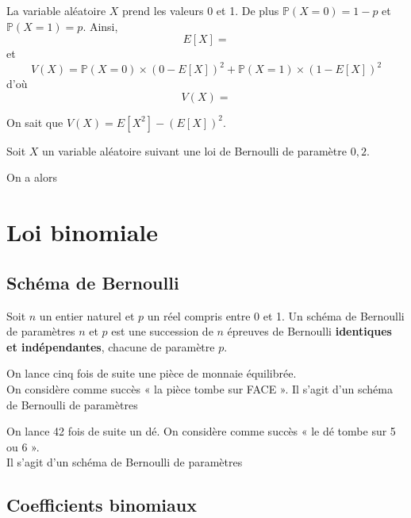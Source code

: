 \documentclass[11pt,fleqn, openany]{book} %
\begin{document}
\begin{demonstration} La variable aléatoire $X$ prend les valeurs 0 et 1. De plus $\mathbb{P}(X=0)=1-p$ et \\ $\mathbb{P}(X=1)=p$. Ainsi,
\[E[X] = \]
et
\[V(X)=\mathbb{P}(X=0) \times (0- E[X])^2 + \mathbb{P}(X=1) \times (1- E[X])^2\]
d'où
\[V(X)=\]
\end{demonstration}

\begin{demonstration}
On sait que $V(X)=E[X^2]-(E[X])^2$.

\vskip50pt

\end{demonstration}

\begin{example} Soit $X$ un variable aléatoire suivant une loi de Bernoulli de paramètre $0,2$. 

On a alors \end{example}

\newpage

\section{Loi binomiale}

\subsection{Schéma de Bernoulli}
\begin{definition}Soit $n$ un entier naturel et $p$ un réel compris entre 0 et 1. Un schéma de Bernoulli de paramètres $n$ et $p$ est une succession de $n$ épreuves de Bernoulli \textbf{identiques et indépendantes}, chacune de paramètre $p$.\end{definition}

\begin{example} On lance cinq fois de suite une pièce de monnaie équilibrée. \\On considère comme succès « la pièce tombe sur FACE ». Il s'agit d'un schéma de Bernoulli de paramètres \end{example}

\begin{example}On lance 42 fois de suite un dé. On considère comme succès « le dé tombe sur 5 ou 6 ».\\ Il s'agit d'un schéma de Bernoulli de paramètres\end{example}

\subsection{Coefficients binomiaux}
\end{document}
